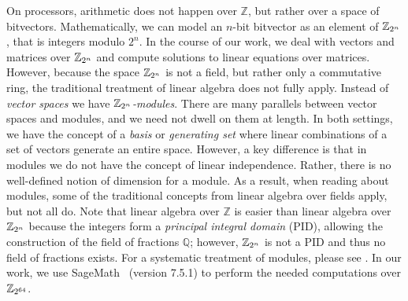 On processors, arithmetic does not happen over $\mathbb{Z}$, but
rather over a space of bitvectors. Mathematically, we can model
an $n$-bit bitvector as an element of $\mathbb{Z}_{2^{n}}$, that is integers
modulo $2^n$. In the course of our work, we deal with vectors and
matrices over $\mathbb{Z}_{2^{n}}$ and compute solutions to linear equations over
matrices. However, because the space $\mathbb{Z}_{2^{n}}$ is not a field, but
rather only a commutative ring, the traditional treatment of linear
algebra does not fully apply. Instead of \emph{vector spaces} we
have \emph{$\mathbb{Z}_{2^{n}}$-modules}. There are many parallels between vector
spaces and modules, and we need not dwell on them at length. In both
settings, we have the concept of a \emph{basis} or \emph{generating
set} where linear combinations of a set of vectors generate an
entire space. However, a key difference is that in modules we do
not have the concept of linear independence. Rather, there is no
well-defined notion of dimension for a module. As a result, when
reading about modules, some of the traditional concepts from linear
algebra over fields apply, but not all do. Note that linear algebra
over $\mathbb{Z}$ is easier than linear algebra over $\mathbb{Z}_{2^{n}}$ because
the integers form a \emph{principal integral domain} (PID), allowing
the construction of the field of fractions $\mathbb{Q}$; however,
$\mathbb{Z}_{2^{n}}$ is not a PID and thus no field of fractions exists. For a
systematic treatment of modules, please see . In
our work, we use SageMath~\cite{sagemath} (version 7.5.1)
to perform the needed computations over $\mathbb{Z}_{2^{64}}$.

